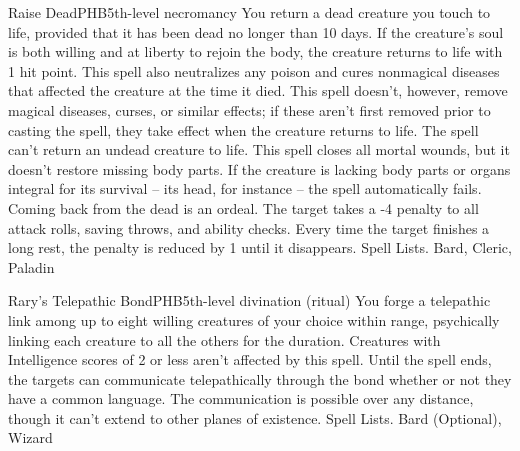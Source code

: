 \begin{spell}{Raise Dead}{PHB}{5th-level necromancy}
{
}
You return a dead creature you touch to life, provided that it has been dead no longer than 10 days. If the creature’s soul is both willing and at liberty to rejoin the body, the creature returns to life with 1 hit point.
This spell also neutralizes any poison and cures nonmagical diseases that affected the creature at the time it died. This spell doesn’t, however, remove magical diseases, curses, or similar effects; if these aren’t first removed prior to casting the spell, they take effect when the creature returns to life. The spell can’t return an undead creature to life.
This spell closes all mortal wounds, but it doesn’t restore missing body parts. If the creature is lacking body parts or organs integral for its survival – its head, for instance – the spell automatically fails.
Coming back from the dead is an ordeal. The target takes a -4 penalty to all attack rolls, saving throws, and ability checks. Every time the target finishes a long rest, the penalty is reduced by 1 until it disappears.
Spell Lists. Bard, Cleric, Paladin
\end{spell}

\begin{spell}{Rary's Telepathic Bond}{PHB}{5th-level divination (ritual)}
{
}
You forge a telepathic link among up to eight willing creatures of your choice within range, psychically linking each creature to all the others for the duration. Creatures with Intelligence scores of 2 or less aren’t affected by this spell.
Until the spell ends, the targets can communicate telepathically through the bond whether or not they have a common language. The communication is possible over any distance, though it can’t extend to other planes of existence.
Spell Lists. Bard (Optional), Wizard
\end{spell}

